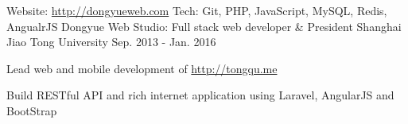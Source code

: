 \begin{cventries}
  \cventry
  {Website: \url{http://dongyueweb.com} Tech: Git, PHP, JavaScript, MySQL, Redis, AngualrJS} %
  {Dongyue Web Studio: Full stack web developer \& President} %
  {Shanghai Jiao Tong University} %
  {Sep. 2013 - Jan. 2016} %
  {
    \begin{cvitems} %
      \item {Lead web and mobile development of \url{http://tongqu.me}}
      \item {Build RESTful API and rich internet application using Laravel, AngularJS and BootStrap}
    \end{cvitems}
  }

\end{cventries}
